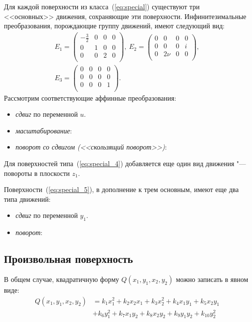 \documentclass[../main.tex]{subfiles}
\begin{document}
Для каждой поверхности из класса~(\ref{eq:special}) существуют три <<основных>> движения, сохраняющие эти поверхности. Инфинитезимальные преобразования, порождающие группу движений, имеют следующий вид:
\begin{gather}
E_1 = 
\left(
\begin{array}{cccc}
 -\frac{3}{2} & 0 & 0 & 0 \\
 0 & 1 & 0 & 0 \\
 0 & 0 & 2 & 0 \\
\end{array}
\right),~
E_2 = 
\left(
\begin{array}{cccc}
 0 & 0 & 0 & 0 \\
 0 & 0 & 0 & i \\
 0 & 2 \nu  & 0 & 0 \\
\end{array}
\right), \nonumber\\
E_3 = 
\left(
\begin{array}{cccc}
 0 & 0 & 0 & 0 \\
 0 & 0 & 0 & 0 \\
 0 & 0 & 0 & 1 \\
\end{array}
\right).
\end{gather}
Рассмотрим соответствующие аффинные преобразования:
\begin{itemize}
\item \textit{сдвиг} по переменной $u$. 
\item \textit{масштабирование}: 
\item \textit{поворот со сдвигом (<<скользящий поворот>>)}:
\end{itemize}

Для поверхностей типа~(\ref{eq:special_4}) добавляется еще один вид движения "--- повороты в плоскости $z_1$. 

Поверхности~(\ref{eq:special_5}), в дополнение к трем основным, имеют еще два типа движений:
\begin{itemize}
\item \textit{сдвиг} по переменной $y_1$.
\item \textit{поворот}:
\end{itemize}

\subsection{Произвольная поверхность}
В общем случае, квадратичную форму $Q(x_1, y_1, x_2, y_2)$ можно записать в явном виде:
\begin{align*}
Q(x_1, y_1, x_2, y_2) &= k_1 x_1^2 + k_2 x_2 x_1 + k_3 x_2^2 + k_4 x_1 y_1 + k_5 x_2 y_1 \\
&+ k_6 y_1^2 + k_7 x_1 y_2 + k_8 x_2 y_2 + k_9 y_1 y_2 + k_{10} y_2^2
\end{align*}
\end{document}
